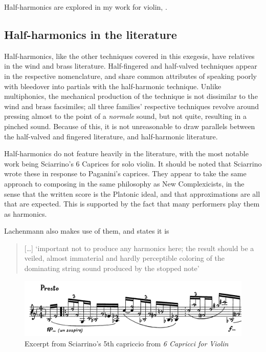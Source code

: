 Half-harmonics are explored in my work for violin, .

\subsection{Half-harmonics in the literature}
Half-harmonics, like the other techniques covered in this exegesis, have relatives in the wind and brass literature. 
Half-fingered and half-valved techniques appear in the respective nomenclature, and share common attributes of speaking poorly with bleedover into partials with the half-harmonic technique.
Unlike multiphonics, the mechanical production of the technique is not dissimilar to the wind and brass facsimiles; all three families' respective techniques revolve around pressing almost to the point of a \emph{normale} sound, but not quite, resulting in a pinched sound.
Because of this, it is not unreasonable to draw parallels between the half-valved and fingered literature, and half-harmonic literature. 

Half-harmonics do not feature heavily in the literature, with the most notable work being Sciarrino's 6 Caprices for solo violin.\autocite{sciarrinoCapricciViolino1976} 
It should be noted that Sciarrino wrote these in response to Paganini's caprices. 
They appear to take the same approach to composing in the same philosophy as New Complexicists, in the sense that the written score is the Platonic ideal, and that approximations are all that are expected.
This is supported by the fact that many performers play them as harmonics.


Lachenmann also makes use of them, and states it is
\begin{quotation}
  [\dots] `important not to produce any harmonics here; the result should be a veiled, almost immaterial and hardly perceptible coloring of the dominating string sound produced by the stopped note'\autocite[foreword]{lachenmannMusikFurStreichquartett1972}
\end{quotation}

\begin{figure}
  \includegraphics[width=\linewidth]{./resources/sciarrinoHalfHarmonicNotation.pdf}
  \caption{Excerpt from Sciarrino's 5th capriccio from \emph{6 Capricci for Violin}}
\label{fig:sciarrinoExcerpt}
\end{figure}

